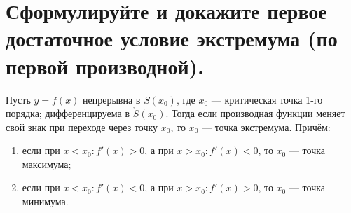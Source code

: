 \newpage
\section{Сформулируйте и докажите первое достаточное условие экстремума (по первой производной).}

\begin{theorem}
	Пусть $y=f(x)$ непрерывна в $S(x_0)$, где $x_0$ --- критическая точка 1-го порядка; дифференцируема в $\mathring{S}(x_0)$. Тогда если производная функции меняет свой знак при переходе через точку $x_0$, то $x_0$ --- точка экстремума. Причём:
	\begin{enumerate}
		\item если при $x < x_0\colon f'(x) > 0$, а при $x > x_0\colon f'(x) < 0$, то $x_0$ --- точка максимума;
		\item если при $x < x_0\colon f'(x) < 0$, а при $x > x_0\colon f'(x) > 0$, то $x_0$ --- точка минимума.
	\end{enumerate}
\end{theorem}
